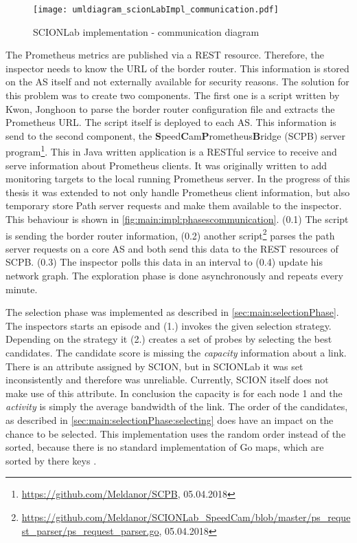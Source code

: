 \documentclass[thesis.tex]{subfiles}
\begin{document}
\begin{figure}
	\centering
	\texttt{[image: umldiagram\_scionLabImpl\_communication.pdf]}
	\caption{SCIONLab implementation - communication diagram}
	\label{fig:main:impl:phasescommunication}
\end{figure}

The Prometheus metrics are published via a REST resource. Therefore, the inspector needs to know the URL of the border router. This information is stored on the AS itself and not externally available for security reasons. The solution for this problem was to create two components. The first one is a script written by Kwon, Jonghoon to parse the border router configuration file and extracts the Prometheus URL. The script itself is deployed to each AS. This information is send to the second component, the \textbf{S}peed\textbf{C}am\textbf{P}rometheus\textbf{B}ridge (SCPB) server program\footnote{\url{https://github.com/Meldanor/SCPB}, 05.04.2018}. This in Java written application is a RESTful service to receive and serve information about Prometheus clients. It was originally written to add monitoring targets to the local running Prometheus server. In the progress of this thesis it was extended to not only handle Prometheus client information, but also temporary store Path server requests and make them available to the inspector. This behaviour is shown in \autoref{fig:main:impl:phasescommunication}.
(0.1) The script is sending the border router information, (0.2) another script\footnote{\url{https://github.com/Meldanor/SCIONLab_SpeedCam/blob/master/ps_request_parser/ps_request_parser.go}, 05.04.2018} parses the path server requests on a core AS and both send this data to the REST resources of SCPB. (0.3) The inspector polls this data in an interval to (0.4) update his network graph. The exploration phase is done asynchronously and repeats every minute.

The selection phase was implemented as described in \autoref{sec:main:selectionPhase}. The inspectors starts an episode and (1.) invokes the given selection strategy. Depending on the strategy it (2.) creates a set of probes by selecting the best candidates. The candidate score is missing the \textit{capacity} information about a link. There is an attribute assigned by SCION, but in SCIONLab it was set inconsistently and therefore was unreliable. Currently, SCION itself does not make use of this attribute. In conclusion the capacity is for each node 1 and the \textit{activity} is simply the average bandwidth of the link.
The order of the candidates, as described in \autoref{sec:main:selectionPhase:selecting} does have an impact on the chance to be selected. This implementation uses the random order instead of the sorted, because there is no standard implementation of Go maps, which are sorted by there keys \cite{goMapsInAction.2013}.
\end{document}
